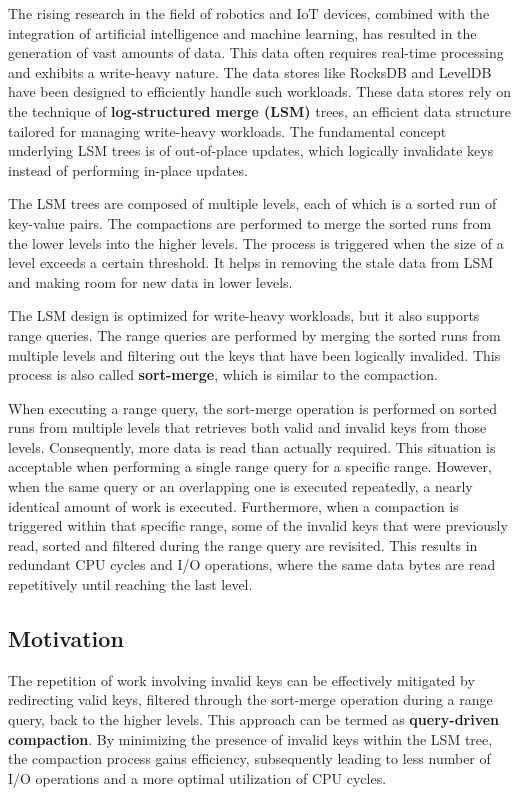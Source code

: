  The rising research in the field of robotics and IoT devices, combined with the 
integration of artificial intelligence and machine learning, has resulted in the generation of vast amounts of data.
This data often requires real-time processing and exhibits a write-heavy nature. The data stores like RocksDB and 
LevelDB have been designed to efficiently handle such workloads. These data stores rely on the technique of
\textbf{log-structured merge (LSM)} trees, an efficient data structure tailored for managing write-heavy workloads. The
fundamental concept underlying LSM trees is of out-of-place updates, which logically invalidate keys instead of 
performing in-place updates.

 The LSM trees are composed of multiple levels, each of which is a sorted run of key-value pairs. 
The compactions are performed to merge the sorted runs from the lower levels into the higher levels. The process is 
triggered when the size of a level exceeds a certain threshold. It helps in removing the stale data from LSM and 
making room for new data in lower levels.

 The LSM design is optimized for write-heavy workloads, but it also supports range queries. The
range queries are performed by merging the sorted runs from multiple levels and filtering out the keys that have been
logically invalided. This process is also called \textbf{sort-merge}, which is similar to the compaction.

 When executing a range query, the sort-merge operation is performed on sorted runs from multiple 
levels that retrieves both valid and invalid keys from those levels. Consequently, more data is read than 
actually required. This situation is acceptable when performing a single range query for a specific range. However, when 
the same query or an overlapping one is executed repeatedly, a nearly identical amount of work is executed. Furthermore, 
when a compaction is triggered within that specific range, some of the invalid keys that were previously read, sorted 
and filtered during the range query are revisited. This results in redundant CPU cycles and I/O operations, where the 
same data bytes are read repetitively until reaching the last level.


\subsection{Motivation}
The repetition of work involving invalid keys can be effectively mitigated by redirecting valid keys, filtered through 
the sort-merge operation during a range query, back to the higher levels. This approach can be termed as 
\textbf{query-driven compaction}. By minimizing the presence of invalid keys within the LSM tree, the compaction process 
gains efficiency, subsequently leading to less number of I/O operations and a more optimal utilization of CPU cycles.


